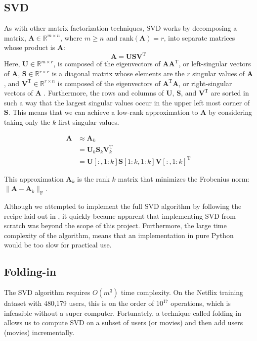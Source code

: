 \documentclass{article} %
\newcommand{\A}{\mathbf{A}}
\newcommand{\T}{\textrm{T}}
\begin{document}
\subsection{SVD}

As with other matrix factorization techniques, SVD works by decomposing a matrix, $\A \in \mathbb{R}^{m \times n}$, where $m \geq n$ and
$\textrm{rank}(\A) = r$,
into separate matrices whose product is $\A$:
$$\A = \mathbf{U}\mathbf{S}\mathbf{V}^{\T}$$
Here, $\mathbf{U} \in \mathbb{R}^{m \times r}$, is composed of the eigenvectors of $\A\A^{\T}$, or left-singular vectors of $\A$, 
$\mathbf{S} \in \mathbb{R}^{r \times r}$ is a diagonal matrix whose elements are the $r$ singular values of $\A$,
and $\mathbf{V}^{\T} \in \mathbb{R}^{r \times n}$ is composed of the
eigenvectors of $\A^{\T}\A$, or right-singular vectors of $\A$
\citep{golub1970}.
Furthermore, the rows and columns of $\mathbf{U}$, $\mathbf{S}$, and $\mathbf{V}^{\T}$ are sorted in such a way that the largest singular values occur in the upper left most corner of $\mathbf{S}$.
This means that we can achieve a low-rank approximation to $\A$ by considering taking only the $k$ first singular values.

\begin{align*}
	\A &\approx \A_k\\
	&= \mathbf{U}_k\mathbf{S}_k\mathbf{V}_k^{\T}\\
	&= \mathbf{U}[:,1:k]\mathbf{S}[1:k,1:k]\mathbf{V}[:,1:k]^{\T}
\end{align*}

This approximation $\A_k$ is the rank $k$ matrix that minimizes the Frobenius norm: $\|\A - \A_k\|_{\textrm{F}}$.

Although we attempted to implement the full SVD algorithm by following the recipe laid out in \cite{recipes2007}, it quickly became apparent that implementing SVD from scratch was beyond the scope of this project.
Furthermore, the large time complexity of the algorithm, means that an implementation in pure Python would be too slow for practical use.

\subsection{Folding-in}
The SVD algorithm requires $O(m^3)$ time complexity.
On the Netflix training dataset with 480,179 users, this is on the order of $10^{17}$ operations, which is infeasible without a super computer.
Fortunately, a technique called folding-in allows us to compute SVD on a subset of users (or movies) and then add users (movies) incrementally.
\end{document}
